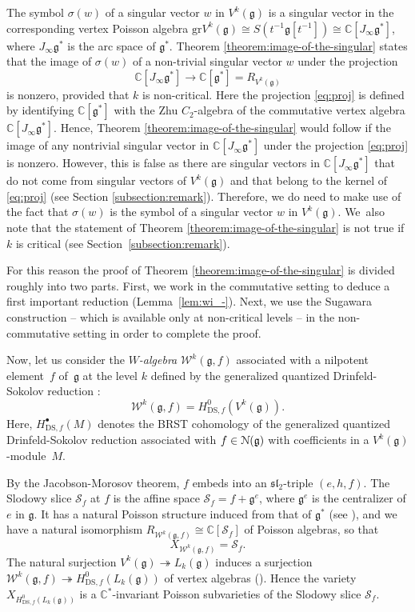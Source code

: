 \documentclass[11pt]{article}
\numberwithin{equation}{section}
\newcommand{\sbullet}{{\scriptscriptstyle\bullet}}
\newcommand{\DS}{\mathrm{DS}}
\let\mathcal \EuScript
\newcommand\C{{\mathbb C}}
\newcommand \g{\mathfrak g}
\newcommand \W{\mathscr{W}}
\theoremstyle{definition}
\begin{document}
The symbol $\sigma(w)$
of a singular vector $w$ in $V^k(\g)$ is
a singular vector
in the corresponding vertex Poisson algebra
$\mathrm{gr} V^k(\g) \cong S(t^{-1}\g[t^{-1}])\cong \C[J_{\infty}\g^*]$,
where $J_\infty \g^*$ is the arc space of $\g^*$.
Theorem \ref{theorem:image-of-the-singular}
states that
the image of $\sigma(w)$
of a non-trivial singular vector $w$
under the projection
\begin{equation}
\C[J_{\infty}\g^*]\to \C[\g^*]=R_{V^k(\g)}
\label{eq:proj}
\end{equation}
is nonzero,
provided that $k$ is non-critical.
Here the projection \eqref{eq:proj} is defined by identifying $\C[\g^*]$ with the
Zhu $C_2$-algebra of the commutative vertex algebra $\C[J_{\infty}\g^*]$.
Hence,
Theorem \ref{theorem:image-of-the-singular}
would follow if
the image of any nontrivial singular vector
in $\C[J_{\infty}\g^*]$
under the projection \eqref{eq:proj}
is nonzero.
However, this is false
as there are singular vectors in $\C[J_{\infty}\g^*]$
that do not come from singular vectors of $V^k(\g)$
and that belong to the kernel of \eqref{eq:proj}
(see Section \ref{subsection:remark}).
Therefore,
we do need to make use of the fact that
$\sigma(w)$ is the symbol of a singular vector $w$ in $V^k(\g)$.
We~also note that
the statement of Theorem \ref{theorem:image-of-the-singular}
is not true if $k$ is critical (see Section~\ref{subsection:remark}).

For this reason the proof of Theorem \ref{theorem:image-of-the-singular}
is divided roughly into two parts.
First, we work in the commutative setting
to deduce
a first important reduction (Lemma~\ref{lem:wi_-}).
Next, we use the Sugawara construction --
which is available only at non-critical levels -- in the non-commutative setting
in order to complete the proof.

Now, let us consider the \emph{$W$-algebra} $\W^k(\g,f)$ associated with
a nilpotent element~$f$ of~$\g$ at the level $k$
defined by the generalized quantized Drinfeld-Sokolov reduction
\cite{FeiFre90,KacRoaWak03}:
\[
\W^k(\g,f)=H^{0}_{\DS,f}(V^k(\g)).
\]
Here, $H^{\sbullet}_{\DS,f}(M)$ denotes the BRST
cohomology of the generalized quantized Drinfeld-Sokolov reduction
associated with $f \in \mathcal{N}(\g)$ with coefficients in
a $V^k(\g)$-module~$M$.

By the Jacobson-Morosov theorem, $f$ embeds into an $\mathfrak{sl}_2$-triple
$(e,h,f)$. The Slodowy slice $\mathscr{S}_{f}$ at $f$ is
the affine
space $\mathscr{S}_{f}=f+\g^{e}$, where $\g^{e}$
is the centralizer of $e$ in $\g$.
It has a natural Poisson structure induced from that of $\g^*$ (see \cite{GanGin02}),
and we have \cite{DSK06,Ara09b} a natural isomorphism
$R_{\W^k(\g,f)}\cong \C[\mathscr{S}_{f}]$ of Poisson algebras, so that
\begin{equation*}
X_{\W^k(\g,f)}= \mathscr{S}_{f}.
\end{equation*}
The natural surjection
$V^k(\g)\twoheadrightarrow L_k(\g)$
induces a surjection
$\W^k(\g,f)\twoheadrightarrow H_{\DS,f}^0(L_k(\g))$
of vertex algebras (\cite{Ara09b}).
Hence the variety
$X_{H^{0}_{\DS,f}(L_k(\g))}$
is a $\C^*$-invariant Poisson
subvarieties of the Slodowy slice $\mathscr{S}_f$.
\end{document}
